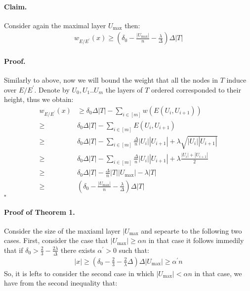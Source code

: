 \documentclass[sigplan,screen]{acmart}
\begin{document}
\begin{multicols*}{2}
  \paragraph{Claim.} Consider again the maximal layer $U_{\max}$ then: 
  \begin{equation*}
    \begin{split}
      w_{E/E^{\prime}}\left( x \right) \ge \left( \delta_{0} - \frac{|U_{\max}|}{n} - \frac{\lambda}{\Delta} \right) \Delta|T| 
    \end{split}
  \end{equation*}
  \paragraph{Proof.} Similarly to above, now we will bound the weight that all the nodes in $T$ induce over $E/E^{\prime}$. Denote by $U_{0}, U_{1} .. U_{m}$ the layers of $T$ ordered corresponded to their height, thus we obtain: 
  \begin{equation*}
    \begin{split}
      w_{E/E^{\prime}}\left( x \right) & \ge \delta_{0}\Delta|T| - \sum_{i\in [m]}{ w \left( E\left( U_{i}, U_{i+1}  \right) \right)  } \\ 
      \ge & \delta_{0}\Delta|T|  - \sum_{i \in [m]}{ E\left( U_{i}, U_{i+1}  \right)  } \\ 
      \ge & \delta_{0}\Delta|T|  -  \sum_{i \in [m]}{ \frac{\Delta}{n}|U_{i}| |U_{i+1}| + \lambda \sqrt{ |U_{i}| |U_{i+1}|} }\\ 
      \ge & \delta_{0}\Delta|T|  -  \sum_{i \in [m]}{ \frac{\Delta}{n}|U_{i}| |U_{i+1}| + \lambda \frac{ |U_{i}|+ |U_{i+1}|}{2 } }\\ 
      \ge & \delta_{0}\Delta|T|  - \frac{\Delta}{n}|T||U_{\max}| -  \lambda |T| \\ 
      \ge & \left( \delta_{0} - \frac{|U_{\max}| }{n}-  \frac{\lambda}{\Delta} \right) \Delta|T| 
    \end{split}
  \end{equation*}
  $\square$
  \paragraph{Proof of Theorem 1.} Consider the size of the maxiaml layer $|U_{\max}$ and sepearte to the following two cases. First, consider the case that $|U_{\max}| \ge  \alpha n $ in that case it follows immedily that if $\delta_{0} > \frac{2}{3} - \frac{2\lambda}{\Delta}$ there exists $\alpha^{\prime} > 0 $ such that:  
  \begin{equation*}
    \begin{split}
      |x| \ge \left( \delta_{0} - \frac{2}{3} - \frac{2}{\lambda}\Delta \right)\Delta|U_{\max}| \ge  \alpha^{\prime} n 
    \end{split}
  \end{equation*}
  So, it is lefts to consider the second case in which $ |U_{\max}| < \alpha n $ in that case, we have from the second inequality that: 


\end{multicols*}
\end{document}
